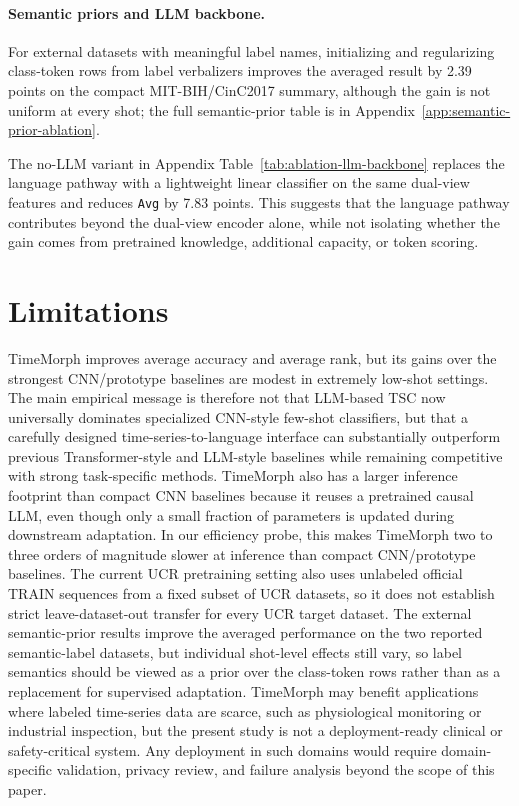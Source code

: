 \documentclass{article}
\begin{document}
\paragraph{Semantic priors and LLM backbone.}
For external datasets with meaningful label names, initializing and regularizing
class-token rows from label verbalizers improves the averaged result by 2.39
points on the compact MIT-BIH/CinC2017 summary, although the gain is not uniform
at every shot; the full semantic-prior table is in
Appendix~\ref{app:semantic-prior-ablation}.

The no-LLM variant in Appendix Table~\ref{tab:ablation-llm-backbone} replaces
the language pathway with a lightweight linear classifier on the same dual-view
features and reduces \texttt{Avg} by 7.83 points. This suggests that the
language pathway contributes beyond the dual-view encoder alone, while not
isolating whether the gain comes from pretrained knowledge, additional capacity,
or token scoring.

\section{Limitations}

TimeMorph improves average accuracy and average rank, but its gains over the strongest CNN/prototype baselines are modest in extremely low-shot settings.
The main empirical message is therefore not that LLM-based TSC now universally dominates specialized CNN-style few-shot classifiers, but that a carefully designed time-series-to-language interface can substantially outperform previous Transformer-style and LLM-style baselines while remaining competitive with strong task-specific methods.
TimeMorph also has a larger inference footprint than compact CNN baselines because it reuses a pretrained causal LLM, even though only a small fraction of parameters is updated during downstream adaptation.
In our efficiency probe, this makes TimeMorph two to three orders of magnitude slower at inference than compact CNN/prototype baselines.
The current UCR pretraining setting also uses unlabeled official TRAIN sequences from a fixed subset of UCR datasets, so it does not establish strict leave-dataset-out transfer for every UCR target dataset.
The external semantic-prior results improve the averaged performance on the two reported semantic-label datasets, but individual shot-level effects still vary, so label semantics should be viewed as a prior over the class-token rows rather than as a replacement for supervised adaptation.
TimeMorph may benefit applications where labeled time-series data are scarce, such as physiological monitoring or industrial inspection, but the present study is not a deployment-ready clinical or safety-critical system.
Any deployment in such domains would require domain-specific validation, privacy review, and failure analysis beyond the scope of this paper.
\end{document}
